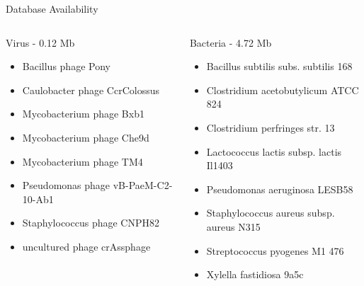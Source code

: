 \documentclass[11pt]{beamer}
\begin{document}
	

	\begin{frame}{Database Availability}
	\begin{columns}
			\begin{block}{Virus - 0.12 Mb}
			\begin{itemize}
			\item Bacillus phage Pony
			\item Caulobacter phage CcrColossus
			\item Mycobacterium phage Bxb1
			\item Mycobacterium phage Che9d
			\item Mycobacterium phage TM4
			\item Pseudomonas phage vB-PaeM-C2-10-Ab1
			\item Staphylococcus phage CNPH82
			\item uncultured phage crAssphage
			\end{itemize}
			\end{block}	
			\begin{block}{Bacteria - 4.72 Mb}
			\begin{itemize}
			\item Bacillus subtilis subs. subtilis 168
			\item Clostridium acetobutylicum ATCC 824
			\item Clostridium perfringes str. 13
			\item Lactococcus lactis subsp. lactis Il1403
			\item Pseudomonas aeruginosa LESB58
			\item Staphylococcus aureus subsp. aureus N315
			\item Streptococcus pyogenes M1 476
			\item Xylella fastidiosa 9a5c
			\end{itemize}
			\end{block}
	\end{columns}
	\end{frame}
\end{document}
